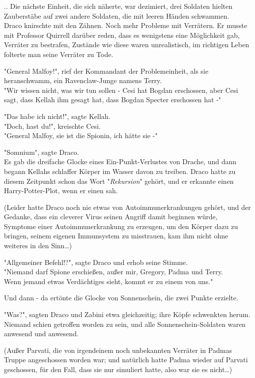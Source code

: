{.. Die nächste Einheit, die sich näherte, war dezimiert, drei Soldaten hielten Zauberstäbe auf zwei andere Soldaten, die mit leeren Händen schwammen.\\ Draco knirschte mit den Zähnen. Noch mehr Probleme mit Verrätern. Er musste mit Professor Quirrell darüber reden, dass es wenigstens eine Möglichkeit gab, Verräter zu bestrafen, Zustände wie diese waren unrealistisch, im richtigen Leben folterte man seine Verräter zu Tode.

"General Malfoy!", rief der Kommandant der Problemeinheit, als sie heranschwamm, ein Ravenclaw-Junge namens Terry.\\ "Wir wissen nicht, was wir tun sollen - Cesi hat Bogdan erschossen, aber Cesi sagt, dass Kellah ihm gesagt hat, dass Bogdan Specter erschossen hat -"

"Das habe ich nicht!", sagte Kellah.\\ "Doch, hast du!", kreischte Cesi.\\ "General Malfoy, sie ist die Spionin, ich hätte sie -"

"Somnium", sagte Draco.\\ Es gab die dreifache Glocke eines Ein-Punkt-Verlustes von Drache, und dann begann Kellahs schlaffer Körper im Wasser davon zu treiben. Draco hatte zu diesem Zeitpunkt schon das Wort "\emph{Rekursion}" gehört, und er erkannte einen Harry-Potter-Plot, wenn er einen sah.

(Leider hatte Draco noch nie etwas von Autoimmunerkrankungen gehört, und der Gedanke, dass ein cleverer Virus seinen Angriff damit beginnen würde, Symptome einer Autoimmunerkrankung zu erzeugen, um den Körper dazu zu bringen, seinem eigenen Immunsystem zu misstrauen, kam ihm nicht ohne weiteres in den Sinn…)

"Allgemeiner Befehl!?", sagte Draco und erhob seine Stimme.\\ "Niemand darf Spione erschießen, außer mir, Gregory, Padma und Terry.\\ Wenn jemand etwas Verdächtiges sieht, kommt er zu einem von uns."

Und dann - da ertönte die Glocke von Sonnenschein, die zwei Punkte erzielte.

"Was?", sagten Draco und Zabini etwa gleichzeitig; ihre Köpfe schwenkten herum. Niemand schien getroffen worden zu sein, und alle Sonnenschein-Soldaten waren anwesend und anwesend.

(Außer Parvati, die von irgendeinem noch unbekannten Verräter in Padmas Truppe angeschossen worden war; und natürlich hatte Padma wieder auf Parvati geschossen, für den Fall, dass sie nur simuliert hatte, also war sie es nicht…)

}
